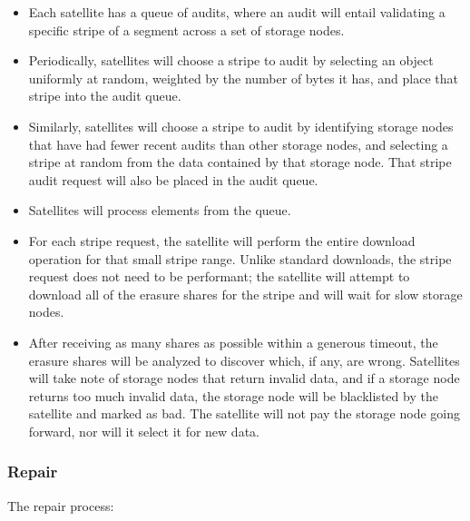 \documentclass[a4paper,10pt]{article} \usepackage[utf8]{inputenc}
\begin{document}
\begin{itemize}
\item Each satellite has a queue of audits, where an audit will entail
  validating a specific stripe of a segment across a set of storage nodes.
\item Periodically, satellites will choose a stripe to audit by selecting
  an object uniformly at random, weighted by the number of bytes it has,
and place that stripe into the audit queue.
\item Similarly, satellites will choose a stripe to audit by identifying
  storage nodes that have had fewer recent audits than other storage nodes, and
  selecting
  a stripe at random from the data contained by that storage node. That stripe
  audit
  request will also be placed in the audit queue.
\item Satellites will process elements from the queue.
\item For each stripe request, the satellite will perform the entire download
  operation for that small stripe range. Unlike standard downloads, the stripe
  request does not need to be performant; the satellite will attempt to
  download all of the erasure shares for the stripe and will wait for slow
  storage nodes.
\item After receiving as many shares as possible within a generous timeout,
  the erasure shares will be analyzed to discover which, if any, are wrong.
  Satellites will take note of storage nodes that return invalid data, and if
  a
  storage node returns too much invalid data, the storage node will be
  blacklisted by the
  satellite and marked as bad. The satellite will not pay the storage
  node going
  forward, nor will it select it for new data.
\end{itemize}

\subsubsection{Repair}

The repair process:
\end{document}
